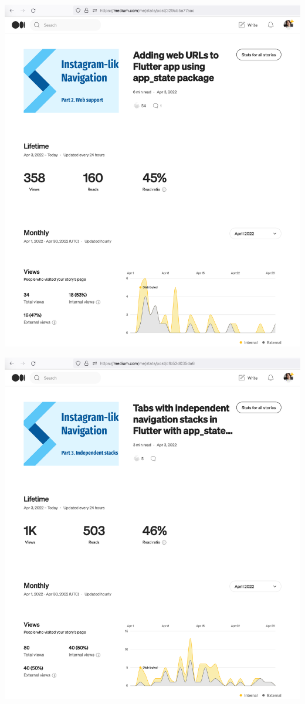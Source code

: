 \begin{center}
    \includegraphics[width=\textwidth]{2022-04-03_3_web}
\end{center}
\pagebreak

\begin{center}
    \includegraphics[width=\textwidth]{2022-04-03_4_stacks}
\end{center}
\pagebreak

